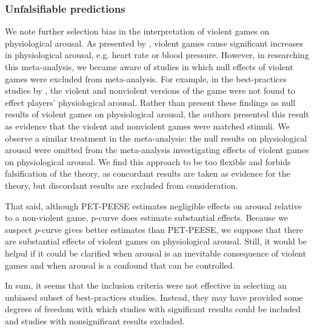 \documentclass[man]{apa6}
\begin{document}
\subsubsection{Unfalsifiable predictions}
We note further selection bias in the interpretation of violent games on physiological arousal. As presented by \citet{Anderson:etal:2010}, violent games cause significant increases in physiological arousal, e.g. heart rate or blood pressure. However, in researching this meta-analysis, we became aware of studies in which null effects of violent games were excluded from meta-analysis. For example, in the best-practices studies by \citet{Carnagey:Anderson:2005}, the violent and nonviolent versions of the game were not found to effect players' physiological arousal. Rather than present these findings as null results of violent games on physiological arousal, the authors presented this result as evidence that the violent and nonviolent games were matched stimuli. We observe a similar treatment in the meta-analysis: the null results on physiological arousal were omitted from the meta-analysis investigating effects of violent games on physiological arousal. We find this approach to be too flexible and forbids falsification of the theory, as concordant results are taken as evidence for the theory, but discordant results are excluded from consideration.

That said, although PET-PEESE estimates negligible effects on arousal relative to a non-violent game, p-curve does estimate substantial effects. Because we suspect $p$-curve gives better estimates than PET-PEESE, we suppose that there are substantial effects of violent games on physiological arousal. Still, it would be helpul if it could be clarified when arousal is an inevitable consequence of violent games and when arousal is a confound that can be controlled.

In sum, it seems that the inclusion criteria were not effective in selecting an unbiased subset of best-practices studies. Instead, they may have provided some degrees of freedom with which studies with significant results could be included and studies with nonsignificant results excluded. %
\end{document}
